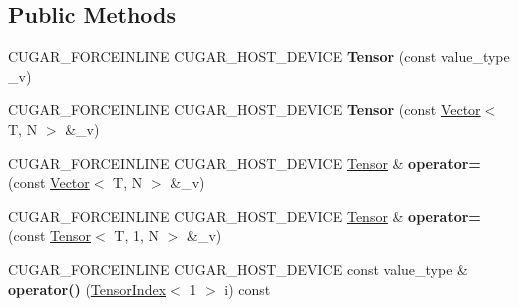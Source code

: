 \subsection*{Public Methods}
\begin{DoxyCompactItemize}
\item 
\mbox{\label{structcugar_1_1_tensor_3_01_t_00_011_00_01_n_01_4_a4d68415b931cbb47dec4505d0c7376fd}} 
C\+U\+G\+A\+R\+\_\+\+F\+O\+R\+C\+E\+I\+N\+L\+I\+NE C\+U\+G\+A\+R\+\_\+\+H\+O\+S\+T\+\_\+\+D\+E\+V\+I\+CE {\bfseries Tensor} (const value\+\_\+type \+\_\+v)
\item 
\mbox{\label{structcugar_1_1_tensor_3_01_t_00_011_00_01_n_01_4_a2b547534ebaeff020426b88ce796fa4b}} 
C\+U\+G\+A\+R\+\_\+\+F\+O\+R\+C\+E\+I\+N\+L\+I\+NE C\+U\+G\+A\+R\+\_\+\+H\+O\+S\+T\+\_\+\+D\+E\+V\+I\+CE {\bfseries Tensor} (const \hyperlink{structcugar_1_1_vector}{Vector}$<$ T, N $>$ \&\+\_\+v)
\item 
\mbox{\label{structcugar_1_1_tensor_3_01_t_00_011_00_01_n_01_4_a2eed0382aaf53eae23da86a7a71a5c46}} 
C\+U\+G\+A\+R\+\_\+\+F\+O\+R\+C\+E\+I\+N\+L\+I\+NE C\+U\+G\+A\+R\+\_\+\+H\+O\+S\+T\+\_\+\+D\+E\+V\+I\+CE \hyperlink{structcugar_1_1_tensor}{Tensor} \& {\bfseries operator=} (const \hyperlink{structcugar_1_1_vector}{Vector}$<$ T, N $>$ \&\+\_\+v)
\item 
\mbox{\label{structcugar_1_1_tensor_3_01_t_00_011_00_01_n_01_4_a79e772ec711d5706cf28405fe2b44b7a}} 
C\+U\+G\+A\+R\+\_\+\+F\+O\+R\+C\+E\+I\+N\+L\+I\+NE C\+U\+G\+A\+R\+\_\+\+H\+O\+S\+T\+\_\+\+D\+E\+V\+I\+CE \hyperlink{structcugar_1_1_tensor}{Tensor} \& {\bfseries operator=} (const \hyperlink{structcugar_1_1_tensor}{Tensor}$<$ T, 1, N $>$ \&\+\_\+v)
\item 
\mbox{\label{structcugar_1_1_tensor_3_01_t_00_011_00_01_n_01_4_a00e2d9d5bac318789aa6bd05c26cffa0}} 
C\+U\+G\+A\+R\+\_\+\+F\+O\+R\+C\+E\+I\+N\+L\+I\+NE C\+U\+G\+A\+R\+\_\+\+H\+O\+S\+T\+\_\+\+D\+E\+V\+I\+CE const value\+\_\+type \& {\bfseries operator()} (\hyperlink{structcugar_1_1_tensor_index}{Tensor\+Index}$<$ 1 $>$ i) const
\item 
\mbox{\label{structcugar_1_1_tensor_3_01_t_00_011_00_01_n_01_4_a5140096672019c80e8d82f8a1139cd65}} 

\end{DoxyCompactItemize}
